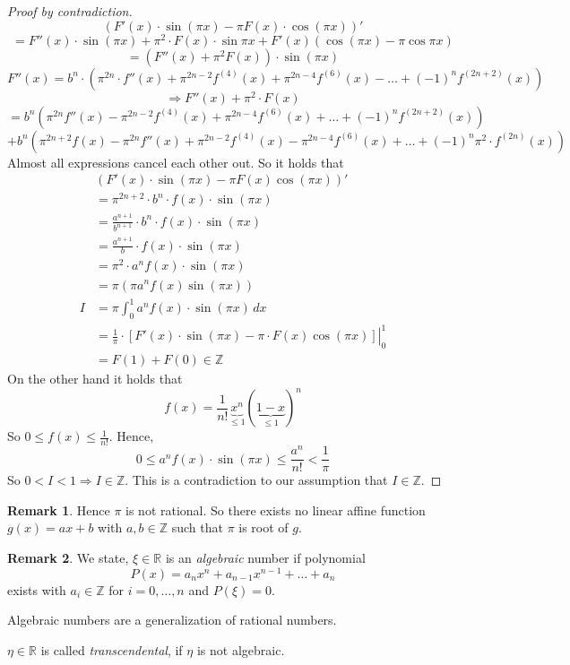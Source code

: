 \documentclass[a4paper,landscape,twocolumn]{article}
\theoremstyle{definition}
\newtheorem{rem}{Remark}
\begin{document}
\begin{proof}[Proof by contradiction]
  \[ (F'(x) \cdot \sin(\pi x) - \pi F(x) \cdot \cos(\pi x))' \]
  \[ = F''(x) \cdot \sin(\pi x) + \pi^2 \cdot F(x) \cdot \sin{\pi x} + F'(x) (\cos(\pi x) - \pi \cos{\pi x}) \]
  \[ = (F''(x) + \pi^2 F(x)) \cdot \sin(\pi x) \]
  \[ F''(x) = b^n \cdot \left(\pi^{2n} \cdot f''(x) + \pi^{2n-2} f^{(4)}(x) + \pi^{2n - 4} f^{(6)}(x) - \ldots + (-1)^n f^{(2n+2)}(x)\right) \]
  \[
    \Rightarrow F''(x) + \pi^2 \cdot F(x)
  \] \[
    = b^n \left(
      \pi^{2n} f''(x) - \pi^{2n - 2} f^{(4)}(x) + \pi^{2n - 4} f^{(6)}(x)
      + \ldots + (-1)^n f^{(2n + 2)}(x)
    \right)
  \] \[
    + b^n \left( \pi^{2n + 2} f(x) - \pi^{2n} f''(x) + \pi^{2n - 2} f^{(4)}(x)
    - \pi^{2n-4} f^{(6)}(x) + \ldots + (-1)^n \pi^2 \cdot f^{(2n)}(x) \right)
  \]
  Almost all expressions cancel each other out.
  So it holds that
  \begin{align*}
    &\left(F'(x) \cdot \sin(\pi x) - \pi F(x) \cos(\pi x)\right)' \\
    &= \pi^{2n + 2} \cdot b^n \cdot f(x) \cdot \sin(\pi x) \\
    &= \frac{a^{n+1}}{b^{n+1}} \cdot b^n \cdot f(x) \cdot \sin(\pi x) \\
    &= \frac{a^{n+1}}{b} \cdot f(x) \cdot \sin(\pi x) \\
    &= \pi^2 \cdot a^n f(x) \cdot \sin(\pi x) \\
    &= \pi \left(\pi a^n f(x) \sin(\pi x)\right) \\
    I &= \pi \int_0^1 a^n f(x) \cdot \sin(\pi x) \, dx \\
    &= \left.\frac1{\pi} \cdot \left[F'(x) \cdot \sin(\pi x) - \pi \cdot F(x) \cos(\pi x)\right]\right|_0^1 \\
    &= F(1) + F(0) \in \mathbb Z
  \end{align*}
  On the other hand it holds that
  \[ f(x) = \frac{1}{n!} \underbrace{x^{n}}_{\leq 1} (\underbrace{1 - x}_{\leq 1})^n \]
  So $0 \leq f(x) \leq \frac1{n!}$. Hence,
  \[ 0 \leq a^n f(x) \cdot \sin(\pi x) \leq \frac{a^n}{n!} < \frac{1}{\pi} \]
  So $0 < I < 1 \Rightarrow I \in \mathbb Z$. This is a contradiction to our assumption that
  $I \in \mathbb Z$.
\end{proof}

\begin{rem}
  Hence $\pi$ is not rational. So there exists no linear affine function $g(x) = ax + b$
  with $a,b \in \mathbb Z$ such that $\pi$ is root of $g$.
\end{rem}

\begin{rem}
  We state, $\xi \in \mathbb R$ is an \emph{algebraic} number if polynomial
  \[ P(x) = a_n x^n + a_{n-1} x^{n-1} + \ldots + a_n \]
  exists with $a_i \in \mathbb Z$ for $i = 0, \ldots, n$ and $P(\xi) = 0$.

  Algebraic numbers are a generalization of rational numbers.

  $\eta \in \mathbb R$ is called \emph{transcendental}, if $\eta$ is not algebraic.
\end{rem}
\end{document}
